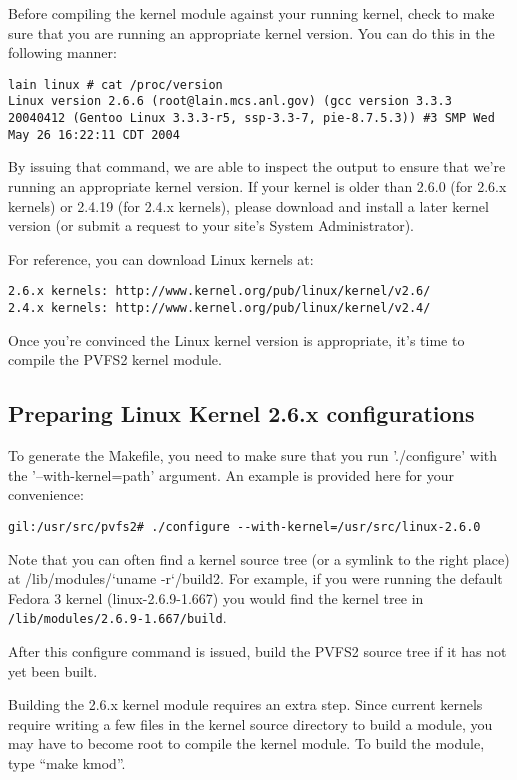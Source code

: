 \documentclass[11pt, letterpaper]{article}
\begin{document}
Before compiling the kernel module against your running kernel, check
to make sure that you are running an appropriate kernel version.  You
can do this in the following manner:

\begin{verbatim}
lain linux # cat /proc/version 
Linux version 2.6.6 (root@lain.mcs.anl.gov) (gcc version 3.3.3
20040412 (Gentoo Linux 3.3.3-r5, ssp-3.3-7, pie-8.7.5.3)) #3 SMP Wed
May 26 16:22:11 CDT 2004
\end{verbatim}

By issuing that command, we are able to inspect the output to ensure
that we're running an appropriate kernel version.  If your kernel is
older than 2.6.0 (for 2.6.x kernels) or 2.4.19 (for 2.4.x kernels),
please download and install a later kernel version (or submit a
request to your site's System Administrator).

For reference, you can download Linux kernels at:
\begin{verbatim}
2.6.x kernels: http://www.kernel.org/pub/linux/kernel/v2.6/
2.4.x kernels: http://www.kernel.org/pub/linux/kernel/v2.4/
\end{verbatim}

Once you're convinced the Linux kernel version is appropriate, it's
time to compile the PVFS2 kernel module.

\subsection{Preparing Linux Kernel 2.6.x configurations}
\label{sec:vfs-configure}

To generate the Makefile, you need to make sure that you run
'./configure' with the '--with-kernel=path' argument.  An example is
provided here for your convenience:

\begin{verbatim}
gil:/usr/src/pvfs2# ./configure --with-kernel=/usr/src/linux-2.6.0
\end{verbatim}

Note that you can often find a kernel source tree (or a symlink to the
right place) at /lib/modules/`uname -r`/build2.  For example, if you were
running the default Fedora 3 kernel (linux-2.6.9-1.667) you would find the
kernel tree in \texttt{/lib/modules/2.6.9-1.667/build}.

After this configure command is issued, build the PVFS2 source tree if it
has not yet been built.

Building the 2.6.x kernel module requires an extra step.  Since
current kernels require writing a few files in the kernel source
directory to build a module, you may have to become root to compile
the kernel module.  To build the module, type ``make kmod''.
\end{document}
